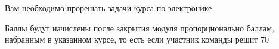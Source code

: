 
Вам необходимо прорешать задачи курса по электронике.

\markSection

Баллы будут начислены после закрытия модуля пропорционально баллам, набранным в указанном курсе, то есть если участник команды решит 70%
